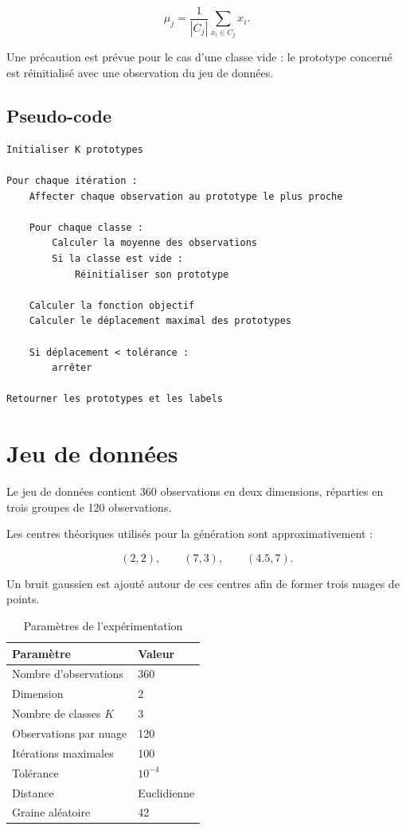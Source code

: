 \documentclass[12pt,a4paper]{article}
\begin{document}
\[
\mu_j=
\frac{1}{|C_j|}
\sum_{x_i\in C_j}x_i.
\]

Une précaution est prévue pour le cas d'une classe vide : le prototype concerné est réinitialisé avec une observation du jeu de données.

\subsection{Pseudo-code}

\begin{verbatim}
Initialiser K prototypes

Pour chaque itération :
    Affecter chaque observation au prototype le plus proche

    Pour chaque classe :
        Calculer la moyenne des observations
        Si la classe est vide :
            Réinitialiser son prototype

    Calculer la fonction objectif
    Calculer le déplacement maximal des prototypes

    Si déplacement < tolérance :
        arrêter

Retourner les prototypes et les labels
\end{verbatim}

\section{Jeu de données}

Le jeu de données contient 360 observations en deux dimensions, réparties en trois groupes de 120 observations.

Les centres théoriques utilisés pour la génération sont approximativement :

\[
(2,2),\qquad (7,3),\qquad (4.5,7).
\]

Un bruit gaussien est ajouté autour de ces centres afin de former trois nuages de points.

\begin{table}[H]
\centering
\begin{tabular}{ll}
\toprule
\textbf{Paramètre} & \textbf{Valeur}\\
\midrule
Nombre d'observations & 360\\
Dimension & 2\\
Nombre de classes $K$ & 3\\
Observations par nuage & 120\\
Itérations maximales & 100\\
Tolérance & $10^{-4}$\\
Distance & Euclidienne\\
Graine aléatoire & 42\\
\bottomrule
\end{tabular}
\caption{Paramètres de l'expérimentation}
\end{table}
\end{document}
